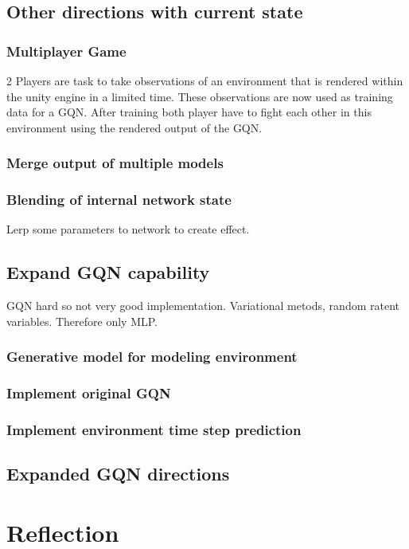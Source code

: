 \documentclass[a4paper, twoside, 10pt]{report}
\begin{document}
\section{Other directions with current state}
\subsection{Multiplayer Game}
2 Players are task to take observations of an environment that is rendered within the unity engine in a limited time. These observations  are now used as training data for a GQN. After training both player have to fight each other in this environment using the rendered output of the GQN.

\subsection{Merge output of multiple models}
\subsection{Blending of internal network state}
Lerp some parameters to network to create effect.

\section{Expand GQN capability}
GQN hard so not very good implementation. Variational metods, random ratent variables. Therefore only MLP.

\subsection{Generative model for modeling environment}
\subsection{Implement original GQN}
\subsection{Implement environment time step prediction}
\section{Expanded GQN directions}



\chapter{Reflection}
\end{document}
